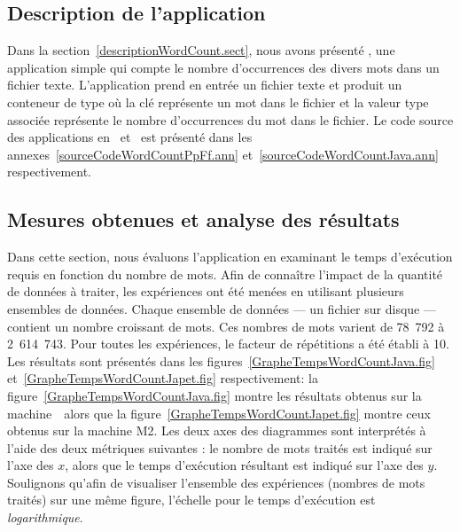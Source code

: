 \subsection{Description de l'application }


Dans la section~\ref{descriptionWordCount.sect}, nous avons pr\'esent\'e , une application simple qui compte le nombre d'occurrences des divers mots dans un fichier texte. L'application prend en entr\'ee un fichier texte et produit un conteneur de type  où la cl\'e repr\'esente un mot dans le fichier et la valeur  type   associ\'ee repr\'esente le nombre d'occurrences du mot dans le fichier. Le code source des applications  en~ et~ est pr\'esent\'e dans les annexes~\ref{sourceCodeWordCountPpFf.ann} et~\ref{sourceCodeWordCountJava.ann} respectivement.


\subsection{Mesures obtenues et analyse des r\'esultats}





Dans cette section, nous 
\'evaluons l'application  en examinant le temps d'ex\'ecution requis en fonction du nombre de mots. Afin de conna\^itre l'impact de la quantit\'e de donn\'ees \`a traiter, les exp\'eriences ont \'et\'e men\'ees en utilisant plusieurs ensembles de donn\'ees. Chaque ensemble de donn\'ees --- un fichier sur disque --- contient un nombre croissant de mots. Ces nombres de mots varient de 78~792 \`a 2~614~743. Pour toutes les exp\'eriences, le facteur de r\'ep\'etitions a \'et\'e \'etabli \`a 10.  Les r\'esultats sont pr\'esent\'es dans les figures~\ref{GrapheTempsWordCountJava.fig} et~\ref{GrapheTempsWordCountJapet.fig} respectivement: la figure~\ref{GrapheTempsWordCountJava.fig} montre les résultats obtenus sur la machine~\ alors que la figure~\ref{GrapheTempsWordCountJapet.fig} montre ceux obtenus sur la machine M2.  Les deux axes des diagrammes sont interpr\'et\'es \`a l'aide des deux m\'etriques suivantes : le nombre de mots trait\'es est indiqu\'e sur l'axe des $x$, alors que le temps d'ex\'ecution r\'esultant est indiqu\'e sur l'axe des $y$.  Soulignons qu'afin de visualiser l'ensemble des exp\'eriences (nombres de mots trait\'es) sur une m\^eme figure, l'\'echelle pour le temps d'ex\'ecution est \emph{logarithmique}. 

